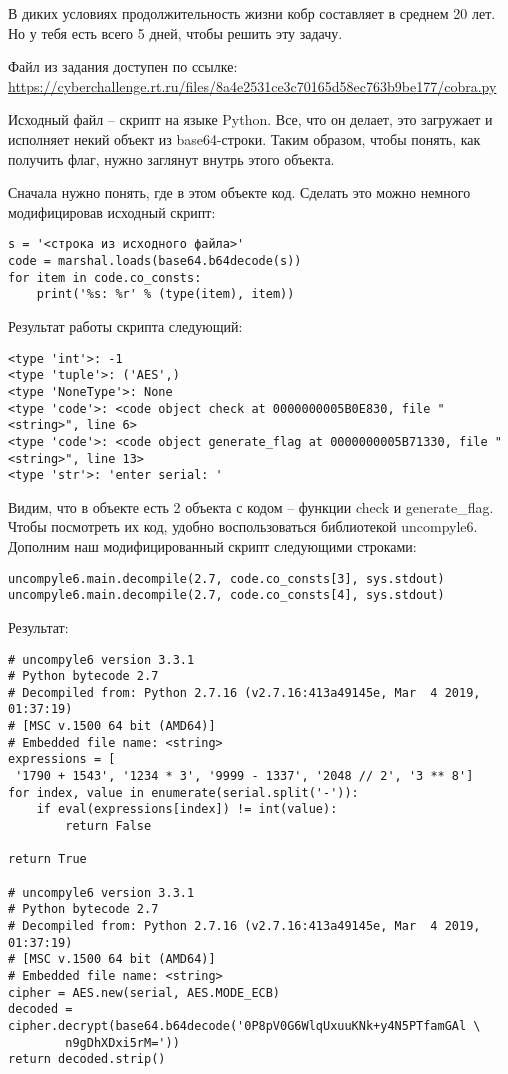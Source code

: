 
В диких условиях продолжительность жизни кобр составляет в среднем 20 лет. Но у тебя есть всего 5 дней, чтобы решить эту задачу.

Файл из задания доступен по ссылке: \url{https://cyberchallenge.rt.ru/files/8a4e2531ce3c70165d58ec763b9be177/cobra.py}

\solutionSection

Исходный файл – скрипт на языке Python. Все, что он делает, это загружает и исполняет некий объект из base64-строки. Таким образом, чтобы понять, как получить флаг, нужно заглянут внутрь этого объекта.

Сначала нужно понять, где в этом объекте код. Сделать это можно немного модифицировав исходный скрипт:

\begin{verbatim}
s = '<строка из исходного файла>'
code = marshal.loads(base64.b64decode(s))
for item in code.co_consts: 
    print('%s: %r' % (type(item), item))
\end{verbatim}

Результат работы скрипта следующий:
\begin{verbatim}
<type 'int'>: -1
<type 'tuple'>: ('AES',)
<type 'NoneType'>: None
<type 'code'>: <code object check at 0000000005B0E830, file "<string>", line 6>
<type 'code'>: <code object generate_flag at 0000000005B71330, file "<string>", line 13>
<type 'str'>: 'enter serial: '
\end{verbatim}

Видим, что в объекте есть 2 объекта с кодом – функции check и generate\_flag. Чтобы посмотреть их код, удобно воспользоваться библиотекой uncompyle6. Дополним наш модифицированный скрипт следующими строками:

\begin{verbatim}
uncompyle6.main.decompile(2.7, code.co_consts[3], sys.stdout)
uncompyle6.main.decompile(2.7, code.co_consts[4], sys.stdout)
\end{verbatim}

Результат:
\begin{verbatim}
# uncompyle6 version 3.3.1
# Python bytecode 2.7
# Decompiled from: Python 2.7.16 (v2.7.16:413a49145e, Mar  4 2019, 01:37:19) 
# [MSC v.1500 64 bit (AMD64)]
# Embedded file name: <string>
expressions = [
 '1790 + 1543', '1234 * 3', '9999 - 1337', '2048 // 2', '3 ** 8']
for index, value in enumerate(serial.split('-')):
    if eval(expressions[index]) != int(value):
        return False

return True

# uncompyle6 version 3.3.1
# Python bytecode 2.7
# Decompiled from: Python 2.7.16 (v2.7.16:413a49145e, Mar  4 2019, 01:37:19) 
# [MSC v.1500 64 bit (AMD64)]
# Embedded file name: <string>
cipher = AES.new(serial, AES.MODE_ECB)
decoded = cipher.decrypt(base64.b64decode('0P8pV0G6WlqUxuuKNk+y4N5PTfamGAl \
        n9gDhXDxi5rM='))
return decoded.strip()
\end{verbatim}

